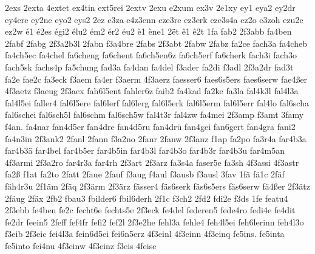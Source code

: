 {    2exs
    2exta
    4extet
    ex4tin
    ext5rei
    2extv
    2exu
    e2xum
    ex3v
    2e1xy
    ey1
    eya2
    ey2dr
    ey4ere
    ey2ne
    eyo2
    eys2
    2ez
    e3za
    e4z3enn
    eze3re
    ez3erk
    eze3s4a
    ez2o
    e3zoh
    ezu2e
    ez2w
    é1
    é2es
    égi2
    élu2
    ém2
    ér2
    éu2
    è1
    ène1
    2ët
    ê1
    ê2t
    1fa
    fab2
    2f3abb
    fa4ben
    2fabf
    2fabg
    2f3a2b3l
    2fabn
    f3a4bre
    2fabs
    2f3abt
    2fabw
    2fabz
    fa2ce
    fach3a
    fa4cheb
    fa4ch5ec
    fa4chel
    fa6cheng
    fa6chent
    fa6ch5en6z
    fa6ch5erf
    fa6cherk
    fach3i
    fach3o
    fach5sk
    fachs4p
    fa5chung
    fad3a
    fa4dan
    fa4del
    f3ader
    fa2di
    f3adl
    2f3a2dr
    fad3t
    fa2e
    fae2c
    fa3eck
    f3aem
    fa4er
    f3aerm
    4f3aerz
    faesser6
    faes6s5ers
    faes6serw
    fae4ßer
    4f3aetz
    f3aeug
    2f3aex
    fah6l5ent
    fahler6z
    faib2
    fa4kad
    fa2ke
    fa3la
    fal4k3l
    fal4l3a
    fal4l5ei
    faller4
    fal6l5ere
    fal6lerf
    fal6lerg
    fal6l5erk
    fal6l5erm
    fal6l5err
    fal4lo
    fal6scha
    fal6schei
    fal6sch5l
    fal6schm
    fal6sch5w
    fal4t3r
    fal4zw
    fa4mei
    2f3amp
    f3amt
    3famy
    f4an.
    fa4nar
    fan4d5er
    fan4dre
    fan4d5ru
    fan4drü
    fan4gei
    fan6gert
    fan4gra
    fani2
    fa4n3in
    2f3ank2
    2fanl
    2fann
    f3a2no
    2fanr
    2fanw
    2f3anz
    f1ap
    fa2po
    fa3r4a
    far4b3a
    far4b3ä
    far4bel
    far4b5er
    far4b5in
    far4b3l
    far4b3o
    far4b3r
    far4b3u
    far4m5an
    4f3armi
    2f3a2ro
    far4r3a
    far4rh
    2f3art
    2f3arz
    fa3s4a
    faser5e
    fa3sh
    4f3assi
    4f3astr
    fa2ß
    f1at
    fa2to
    2fatt
    2faue
    2fauf
    f3aug
    f4aul
    f3ausb
    f3ausl
    3fav
    1fä
    fä1c
    2fäf
    fäh4r3u
    2f1äm
    2fäq
    2f3ärm
    2f3ärz
    fässer4
    fäs6serk
    fäs6s5ers
    fäs6serw
    fä4ßer
    2f3ätz
    2fäug
    2fäx
    2fb2
    fbau3
    fbilder6
    fbil6derh
    2f1c
    f3ch2
    2fd2
    fdi2e
    f3ds
    1fe
    featu4
    2f3ebb
    fe4ben
    fe2c
    fecht6e
    fechts5e
    2f3eck
    fe4del
    federen5
    fede4ro
    fedi4e
    fe4dit
    fe2dr
    feein5
    2feff
    fef4fr
    fefi2
    fef2l
    2f3e2he
    fehl3a
    fehle4
    feh4l5ei
    feh6lerinn
    feh4l3o
    f3eib
    2f3eic
    fei4l3a
    fein6d5ei
    fei6n5erz
    4f3einl
    4f3einn
    4f3einq
    fe5ins.
    fe5inta
    fe5into
    fei4nu
    4f3einw
    4f3einz
    f3eis
    4feise
}
